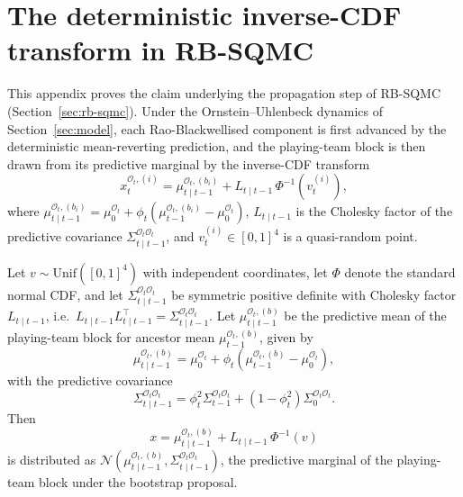 \section{The deterministic inverse-CDF transform in RB-SQMC}
\label{app:inv-cdf-proof}

This appendix proves the claim underlying the propagation step of RB-SQMC (Section~\ref{sec:rb-sqmc}). Under the Ornstein--Uhlenbeck dynamics of Section~\ref{sec:model}, each Rao-Blackwellised component is first advanced by the deterministic mean-reverting prediction, and the playing-team block is then drawn from its predictive marginal by the inverse-CDF transform
\begin{equation}
x_t^{\mathcal{O}_t,(i)} = \mu_{t \mid t-1}^{\mathcal{O}_t,(b_i)} + L_{t \mid t-1}\, \Phi^{-1}\!\left( v_t^{(i)} \right),
\end{equation}
where $\mu_{t \mid t-1}^{\mathcal{O}_t,(b_i)} = \mu_0^{\mathcal{O}_t} + \phi_t(\mu_{t-1}^{\mathcal{O}_t,(b_i)} - \mu_0^{\mathcal{O}_t})$, $L_{t \mid t-1}$ is the Cholesky factor of the predictive covariance $\Sigma_{t \mid t-1}^{\mathcal{O}_t \mathcal{O}_t}$, and $v_t^{(i)} \in [0,1]^4$ is a quasi-random point.

\begin{proposition}
\label{prop:invcdf}
Let $v \sim \mathrm{Unif}([0,1]^4)$ with independent coordinates, let $\Phi$ denote the standard normal CDF, and let $\Sigma_{t \mid t-1}^{\mathcal{O}_t \mathcal{O}_t}$ be symmetric positive definite with Cholesky factor $L_{t \mid t-1}$, i.e.\ $L_{t \mid t-1} L_{t \mid t-1}^{\top} = \Sigma_{t \mid t-1}^{\mathcal{O}_t \mathcal{O}_t}$. Let $\mu_{t \mid t-1}^{\mathcal{O}_t,(b)}$ be the predictive mean of the playing-team block for ancestor mean $\mu_{t-1}^{\mathcal{O}_t,(b)}$, given by
\begin{equation}
\mu_{t \mid t-1}^{\mathcal{O}_t,(b)} = \mu_0^{\mathcal{O}_t} + \phi_t \!\left( \mu_{t-1}^{\mathcal{O}_t,(b)} - \mu_0^{\mathcal{O}_t} \right),
\end{equation}
with the predictive covariance
\begin{equation}
\Sigma_{t \mid t-1}^{\mathcal{O}_t \mathcal{O}_t} = \phi_t^2 \Sigma_{t-1}^{\mathcal{O}_t \mathcal{O}_t} + (1 - \phi_t^2) \Sigma_0^{\mathcal{O}_t \mathcal{O}_t}.
\end{equation}
Then
\begin{equation}
x = \mu_{t \mid t-1}^{\mathcal{O}_t,(b)} + L_{t \mid t-1}\, \Phi^{-1}(v)
\end{equation}
is distributed as $\mathcal{N}\!\left( \mu_{t \mid t-1}^{\mathcal{O}_t,(b)}, \Sigma_{t \mid t-1}^{\mathcal{O}_t \mathcal{O}_t} \right)$, the predictive marginal of the playing-team block under the bootstrap proposal.
\end{proposition}

